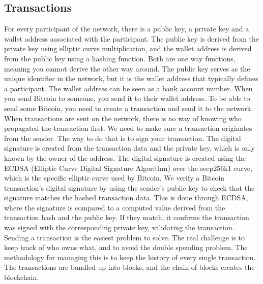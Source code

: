\subsection{Transactions}
For every participant of the network, there is a public key, a private key and a wallet address associated with the participant.
The public key is derived from the private key using elliptic curve multiplication, and the wallet address is derived from the public key using a hashing function.
Both are one way functions, meaning you cannot derive the other way around.
The public key serves as the unique identifier in the network, but it is the wallet address that typically defines a participant.
The wallet address can be seen as a bank account number. When you send Bitcoin to someone, you send it to their wallet address.
To be able to send some Bitcoin, you need to create a transaction and send it to the network.
When transactions are sent on the network, there is no way of knowing who propagated the transaction first.
We need to make sure a transaction originates from the sender. The way to do that is to sign your transaction. The digital signature is created from the transaction data and the private key, which is only known by the owner of the address.
The digital signature is created using the ECDSA (Elliptic Curve Digital Signature Algorithm) over the secp256k1 curve, which is the specific elliptic curve used by Bitcoin.
We verify a Bitcoin transaction's digital signature by using the sender's public key to check that the signature matches the hashed transaction data.
This is done through ECDSA, where the signature is compared to a computed value derived from the transaction hash and the public key.
If they match, it confirms the transaction was signed with the corresponding private key, validating the transaction.
Sending a transaction is the easiest problem to solve. The real challenge is to keep track of who owns what, and to avoid the double spending problem.
The methodology for managing this is to keep the history of every single transaction. The transactions are bundled up into blocks, and the chain of blocks creates the blockchain. \cite{MB17}

